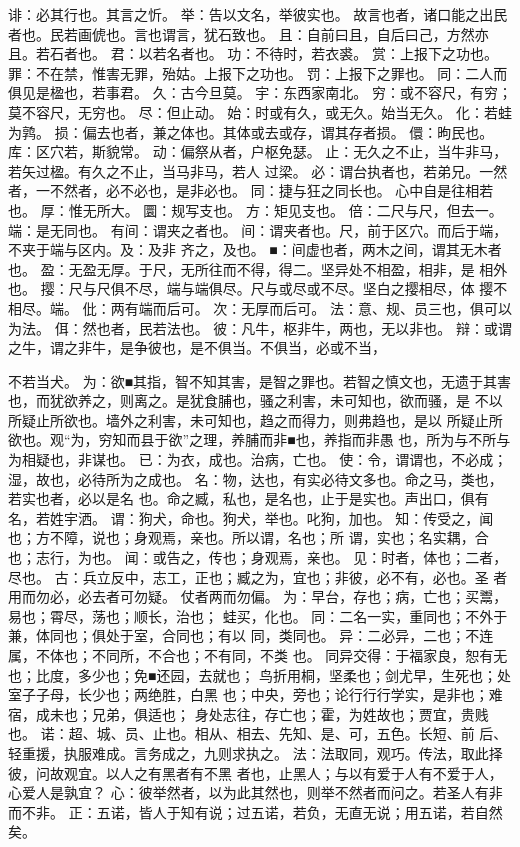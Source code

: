 \documentclass[12pt,UTF8]{ctexbook}
\begin{document}
诽：必其行也。其言之忻。 
举：告以文名，举彼实也。 
故言也者，诸口能之出民者也。民若画俿也。言也谓言，犹石致也。 
且：自前曰且，自后曰己，方然亦且。若石者也。 
君：以若名者也。 
功：不待时，若衣裘。 
赏：上报下之功也。 
罪：不在禁，惟害无罪，殆姑。上报下之功也。 
罚：上报下之罪也。 
同：二人而俱见是楹也，若事君。 
久：古今旦莫。 
宇：东西家南北。 
穷：或不容尺，有穷；莫不容尺，无穷也。 
尽：但止动。 
始：时或有久，或无久。始当无久。 
化：若蛙为鹑。 
损：偏去也者，兼之体也。其体或去或存，谓其存者损。 
儇：昫民也。 
库：区穴若，斯貌常。 
动：偏祭从者，户枢免瑟。 
止：无久之不止，当牛非马，若矢过楹。有久之不止，当马非马，若人 
过梁。 
必：谓台执者也，若弟兄。一然者，一不然者，必不必也，是非必也。 
同：捷与狂之同长也。 
心中自是往相若也。 
厚：惟无所大。 
圜：规写支也。 
方：矩见支也。 
倍：二尺与尺，但去一。 
端：是无同也。 
有间：谓夹之者也。 
间：谓夹者也。尺，前于区穴。而后于端，不夹于端与区内。及：及非 
齐之，及也。 
■：间虚也者，两木之间，谓其无木者也。 
盈：无盈无厚。于尺，无所往而不得，得二。坚异处不相盈，相非，是 
相外也。 
撄：尺与尺俱不尽，端与端俱尽。尺与或尽或不尽。坚白之撄相尽，体 
撄不相尽。端。 
仳：两有端而后可。 
次：无厚而后可。 
法：意、规、员三也，俱可以为法。 
佴：然也者，民若法也。 
彼：凡牛，枢非牛，两也，无以非也。 
辩：或谓之牛，谓之非牛，是争彼也，是不俱当。不俱当，必或不当， 

不若当犬。 
为：欲■其指，智不知其害，是智之罪也。若智之慎文也，无遗于其害 
也，而犹欲养之，则离之。是犹食脯也，骚之利害，未可知也，欲而骚，是 
不以所疑止所欲也。墙外之利害，未可知也，趋之而得力，则弗趋也，是以 
所疑止所欲也。观“为，穷知而县于欲”之理，养脯而非■也，养指而非愚 
也，所为与不所与为相疑也，非谋也。 
已：为衣，成也。治病，亡也。 
使：令，谓谓也，不必成；湿，故也，必待所为之成也。 
名：物，达也，有实必待文多也。命之马，类也，若实也者，必以是名 
也。命之臧，私也，是名也，止于是实也。声出口，俱有名，若姓宇洒。 
谓：狗犬，命也。狗犬，举也。叱狗，加也。 
知：传受之，闻也；方不障，说也；身观焉，亲也。所以谓，名也；所 
谓，实也；名实耦，合也；志行，为也。 
闻：或告之，传也；身观焉，亲也。 
见：时者，体也；二者，尽也。 
古：兵立反中，志工，正也；臧之为，宜也；非彼，必不有，必也。圣 
者用而勿必，必去者可勿疑。 
仗者两而勿偏。 
为：早台，存也；病，亡也；买鬻，易也；霄尽，荡也；顺长，治也； 
蛙买，化也。 
同：二名一实，重同也；不外于兼，体同也；俱处于室，合同也；有以 
同，类同也。 
异：二必异，二也；不连属，不体也；不同所，不合也；不有同，不类 
也。 
同异交得：于福家良，恕有无也；比度，多少也；免■还园，去就也； 
鸟折用桐，坚柔也；剑尤早，生死也；处室子子母，长少也；两绝胜，白黑 
也；中央，旁也；论行行行学实，是非也；难宿，成未也；兄弟，俱适也； 
身处志往，存亡也；霍，为姓故也；贾宜，贵贱也。 
诺：超、城、员、止也。相从、相去、先知、是、可，五色。长短、前 
后、轻重援，执服难成。言务成之，九则求执之。 
法：法取同，观巧。传法，取此择彼，问故观宜。以人之有黑者有不黑 
者也，止黑人；与以有爱于人有不爱于人，心爱人是孰宜？ 
心：彼举然者，以为此其然也，则举不然者而问之。若圣人有非而不非。 
正：五诺，皆人于知有说；过五诺，若负，无直无说；用五诺，若自然 
矣。 
\end{document}
